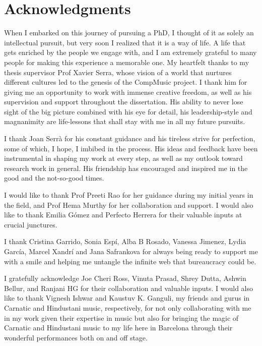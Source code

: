 \chapter*{Acknowledgments}

When I embarked on this journey of pursuing a PhD, I thought of it as solely an intellectual pursuit, but very soon I realized that it is a way of life. A life that gets enriched by the people we engage with, and I am extremely grateful to many people for making this experience a memorable one. My heartfelt thanks to my thesis supervisor Prof Xavier Serra, whose vision of a world that nurtures different cultures led to the genesis of the CompMusic project. I thank him for giving me an opportunity to work with immense creative freedom, as well as his supervision and support throughout the dissertation. His ability to never lose sight of the big picture combined with his eye for detail, his leadership-style and magnanimity are life-lessons that shall stay with me in all my future pursuits.

I thank Joan Serrà for his constant guidance and his tireless strive for perfection, some of which, I hope, I imbibed in the process. His ideas and feedback have been instrumental in shaping my work at every step, as well as my outlook toward research work in general. His friendship has encouraged and inspired me in the good and the not-so-good times. 

I would like to thank Prof Preeti Rao for her guidance during my initial years in the field, and Prof Hema Murthy for her collaboration and support. I would also like to thank Emilia Gómez and Perfecto Herrera for their valuable inputs at crucial junctures.  

I thank Cristina Garrido, Sonia Espí, Alba B Rosado, Vanessa Jimenez, Lydia García, Marcel Xandrí and Jana Safrankova for always being ready to support me with a smile and helping me untangle the infinite web that bureaucracy could be. 

I gratefully acknowledge Joe Cheri Ross, Vinuta Prasad, Shrey Dutta, Ashwin Bellur, and Ranjani HG for their collaboration and valuable inputs. I would also like to thank Vignesh Ishwar and Kaustuv K. Ganguli, my friends and gurus in Carnatic and Hindustani music, respectively, for not only collaborating with me in my work given their expertise in music but also for bringing the magic of Carnatic and Hindustani music to my life here in Barcelona through their wonderful performances both on and off stage.

